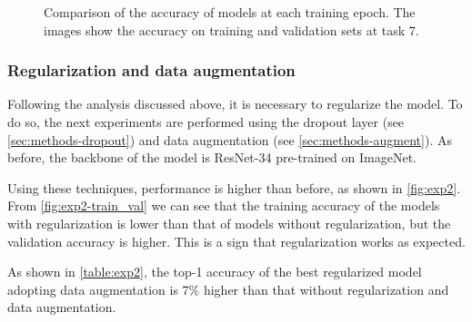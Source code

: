 \begin{figure}[H]
    \centering
    \centering
    \caption{Comparison of the accuracy of models at each training epoch. The images show the accuracy on training and validation sets at task 7.}%
    \label{fig:exp1-train_val}%
\end{figure}

\subsubsection{Regularization and data augmentation}
Following the analysis discussed above, it is necessary to regularize the model.
To do so, the next experiments are performed using the dropout layer (see \autoref{sec:methods-dropout}) and data augmentation (see \autoref{sec:methods-augment}).
As before, the backbone of the model is ResNet-34 pre-trained on ImageNet.

Using these techniques, performance is higher than before, as shown in \autoref{fig:exp2}.
From \autoref{fig:exp2-train_val} we can see that the training accuracy of the models with regularization is lower than that of models without regularization, but the validation accuracy is higher.
This is a sign that regularization works as expected.

As shown in \autoref{table:exp2}, the top-1 accuracy of the best regularized model adopting data augmentation is 7\% higher than that without regularization and data augmentation.



